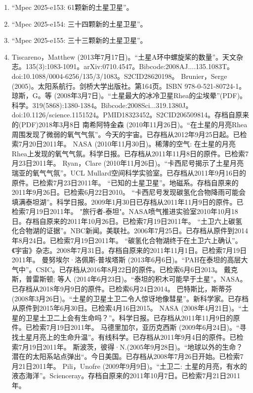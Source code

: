 \begin{enumerate}
\item “Mpec 2025-e153: 61颗新的土星卫星”。
\item “Mpec 2025-e154: 三十四颗新的土星卫星”。
\item “Mpec 2025-e155: 三十三颗新的土星卫星”。
\item Tiscareno，Matthew (2013年7月17日)。“土星A环中螺旋桨的数量”。天文杂志。135(3):1083-1091。arXiv:0710.4547。Bibcode:2008AJ....135.1083T。doi:10.1088/0004-6256/135/3/1083。S2CID28620198。 
 Brunier，Serge (2005)。太阳系航行。剑桥大学出版社。第164页。ISBN 978-0-521-80724-1。
 琼斯，G。等 (2008年3月7日)。“土星最大的冰冷卫星Rhea的尘埃晕”(PDF)。科学。319(5868):1380-1384。Bibcode:2008Sci...319.1380J。doi:10.1126/science.1151524。PMID18323452。S2CID206509814。存档自原来的(PDF)2018年3月8日   
 南希阿特金森 (2010年11月26日)。“在土星的月亮Rhea周围发现了微弱的氧气气氛”。今天的宇宙。已存档从2012年9月25日起。已检索7月20日2011年。
 NASA (2010年11月30日)。稀薄的空气: 在土星的月亮Rhea上发现的氧气气氛。科学日报。已存档从2011年11月8日的原件。已检索7月23日2011年。
 Ryan，Clare (2010年11月26日)。“卡西尼号揭示了土星月亮瑞亚的氧气气氛”。UCL Mullard空间科学实验室。已存档从2011年9月16日的原件。已检索7月23日2011年。
 “已知的土星卫星”。地磁系。存档自原来的2011年9月26日。已检索6月22日2010。
 “卡西尼号发现碳氢化合物降雨可能会填满泰坦湖”。科学日报。2009年1月30日已存档从2011年11月9日的原件。已检索7月19日2011年。
 "旅行者-泰坦"。NASA喷气推进实验室2010年10月18日。存档自原来的2011年10月26日。已检索7月19日2011年。
 “土卫六上碳氢化合物湖的证据”。NBC新闻。美联社。2006年7月25日。已存档从原件到2014年8月24日。已检索7月19日2011年。
 “碳氢化合物湖终于在土卫六上确认”。《宇宙》杂志。2008年7月31日。存档自原来的2011年11月1日。已检索7月19日2011年。
 曼努埃尔·洛佩斯-普埃塔斯 (2013年6月6日)。“PAH在泰坦的高层大气中”。CSIC。已存档从2016年8月22日的原件。已检索6月6日2013。
 戴克斯，普雷斯顿; 等人 (2014年6月23日)。“泰坦的积木可能早于土星”。NASA。已存档从2018年9月9日的原件。已检索6月24日2014。
 巴特斯比，斯蒂芬 (2008年3月26日)。“土星的卫星土卫二令人惊讶地像彗星”。新科学家。已存档从原件到2015年6月30日。已检索4月16日2015。
 NASA (2008年4月21日)。“土星的卫星土卫二上会有生命吗？”。科学日报。已存档从2011年11月9日的原件。已检索7月19日2011年。
 马德里加尔，亚历克西斯 (2009年6月24日)。“寻找土星月亮上的生命升温”。有线科学。已存档从2011年9月4日的原件。已检索7月19日2011年。
 斯波茨，彼得·N.(2005年9月28日)。“地球以外的生命？潜在的太阳系站点弹出“。今日美国。已存档从2008年7月26日开始。已检索7月21日2011年。
 Pili，Unofre (2009年9月9日)。“土卫二: 土星的月亮，有水的液态海洋”。Scienceray。存档自原来的2011年10月7日。已检索7月21日2011年。

\end{enumerate}
